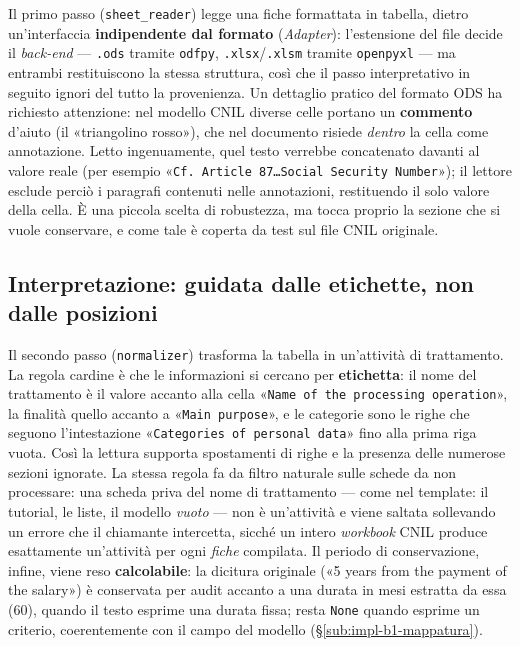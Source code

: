 Il primo passo (\texttt{sheet\_reader}) legge una fiche formattata in tabella, dietro un'interfaccia \textbf{indipendente dal formato} (\emph{Adapter}): l'estensione del file decide il \textit{back-end} --- \texttt{.ods} tramite \texttt{odfpy}, \texttt{.xlsx}/\texttt{.xlsm} tramite \texttt{openpyxl} --- ma entrambi restituiscono la stessa struttura, così che il passo interpretativo in seguito ignori del tutto la provenienza. Un dettaglio pratico del formato ODS ha richiesto attenzione: nel modello CNIL diverse celle portano un \textbf{commento} d'aiuto (il «triangolino rosso»), che nel documento risiede \emph{dentro} la cella come annotazione. Letto ingenuamente, quel testo verrebbe concatenato davanti al valore reale (per esempio «\texttt{Cf.\ Article~87\ldots{}Social Security Number}»); il lettore esclude perciò i paragrafi contenuti nelle annotazioni, restituendo il solo valore della cella. È una piccola scelta di robustezza, ma tocca proprio la sezione che si vuole conservare, e come tale è coperta da test sul file CNIL originale.

\subsection{Interpretazione: guidata dalle etichette, non dalle posizioni}
\label{sub:impl-b1-normalizer}

Il secondo passo (\texttt{normalizer}) trasforma la tabella in un'attività di trattamento. La regola cardine è che le informazioni si cercano per \textbf{etichetta}: il nome del trattamento è il valore accanto alla cella «\texttt{Name of the processing operation}», la finalità quello accanto a «\texttt{Main purpose}», e le categorie sono le righe che seguono l'intestazione «\texttt{Categories of personal data}» fino alla prima riga vuota. Così la lettura supporta spostamenti di righe e la presenza delle numerose sezioni ignorate. La stessa regola fa da filtro naturale sulle schede da non processare: una scheda priva del nome di trattamento --- come nel template: il tutorial, le liste, il modello \emph{vuoto} --- non è un'attività e viene saltata sollevando un errore che il chiamante intercetta, sicché un intero \emph{workbook} CNIL produce esattamente un'attività per ogni \emph{fiche} compilata. Il periodo di conservazione, infine, viene reso \textbf{calcolabile}: la dicitura originale («5 years from the payment of the salary») è conservata per audit accanto a una durata in mesi estratta da essa (60), quando il testo esprime una durata fissa; resta \texttt{None} quando esprime un criterio, coerentemente con il campo del modello (§\ref{sub:impl-b1-mappatura}).

